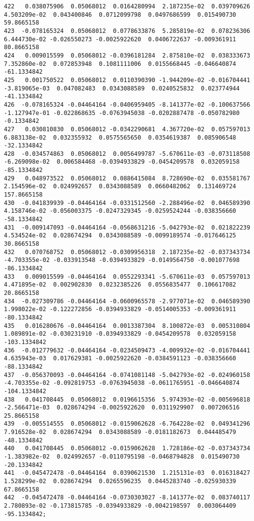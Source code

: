 \documentclass[15pt,a4paper,openright]{article}
\begin{document}
\begin{lstlisting}[language=AMPL, caption = data file]
422   0.038075906  0.05068012  0.0164280994  2.187235e-02  0.039709626  4.503209e-02  0.043400846  0.0712099798  0.0497686599  0.015490730   59.8665158
423  -0.078165324  0.05068012  0.0778633876  5.285819e-02  0.078236306  6.444730e-02 -0.026550273 -0.0025922620  0.0406722637 -0.009361911   80.8665158
424   0.009015599  0.05068012 -0.0396181284  2.875810e-02  0.038333673  7.352860e-02  0.072853948  0.1081111006  0.0155668445 -0.046640874  -61.1334842
425   0.001750522  0.05068012  0.0110390390 -1.944209e-02 -0.016704441 -3.819065e-03  0.047082483  0.0343088589  0.0240525832  0.023774944  -41.1334842
426  -0.078165324 -0.04464164 -0.0406959405 -8.141377e-02 -0.100637566 -1.127947e-01 -0.022868635 -0.0763945038 -0.0202887478 -0.050782980   -0.1334842
427   0.030810830  0.05068012 -0.0342290681  4.367720e-02  0.057597013  6.883138e-02  0.032355932  0.0575565650  0.0354619387  0.085906548  -32.1334842
428  -0.034574863  0.05068012  0.0056499787 -5.670611e-03 -0.073118508 -6.269098e-02  0.006584468 -0.0394933829 -0.0454209578  0.032059158  -85.1334842
429   0.048973522  0.05068012  0.0886415084  8.728690e-02  0.035581767  2.154596e-02  0.024992657  0.0343088589  0.0660482062  0.131469724  157.8665158
430  -0.041839939 -0.04464164 -0.0331512560 -2.288496e-02  0.046589390  4.158746e-02 -0.056003375 -0.0247329345 -0.0259524244 -0.038356660  -58.1334842
431  -0.009147093 -0.04464164 -0.0568631216 -5.042793e-02  0.021822239  4.534524e-02  0.028674294  0.0343088589 -0.0099189574 -0.017646125   30.8665158
432   0.070768752  0.05068012 -0.0309956318  2.187235e-02 -0.037343734 -4.703355e-02 -0.033913548 -0.0394933829 -0.0149564750 -0.001077698  -86.1334842
433   0.009015599 -0.04464164  0.0552293341 -5.670611e-03  0.057597013  4.471895e-02  0.002902830  0.0232385226  0.0556835477  0.106617082   20.8665158
434  -0.027309786 -0.04464164 -0.0600965578 -2.977071e-02  0.046589390  1.998022e-02 -0.122272856 -0.0394933829 -0.0514005353 -0.009361911  -80.1334842
435   0.016280676 -0.04464164  0.0013387304  8.100872e-03  0.005310804  1.089891e-02 -0.030231910 -0.0394933829 -0.0454209578  0.032059158 -103.1334842
436  -0.012779632 -0.04464164 -0.0234509473 -4.009932e-02 -0.016704441  4.635943e-03  0.017629381 -0.0025922620 -0.0384591123 -0.038356660  -88.1334842
437  -0.056370093 -0.04464164 -0.0741081148 -5.042793e-02 -0.024960158 -4.703355e-02 -0.092819753 -0.0763945038 -0.0611765951 -0.046640874 -104.1334842
438   0.041708445  0.05068012  0.0196615356  5.974393e-02 -0.005696818 -2.566471e-03  0.028674294 -0.0025922620  0.0311929907  0.007206516   25.8665158
439  -0.005514555  0.05068012 -0.0159062628 -6.764228e-02  0.049341296  7.916528e-02  0.028674294  0.0343088589 -0.0181182673  0.044485479  -48.1334842
440   0.041708445  0.05068012 -0.0159062628  1.728186e-02 -0.037343734 -1.383982e-02  0.024992657 -0.0110795198 -0.0468794828  0.015490730  -20.1334842
441  -0.045472478 -0.04464164  0.0390621530  1.215131e-03  0.016318427  1.528299e-02  0.028674294  0.0265596235  0.0445283740 -0.025930339   67.8665158
442  -0.045472478 -0.04464164 -0.0730303027 -8.141377e-02  0.083740117  2.780893e-02 -0.173815785 -0.0394933829 -0.0042198597  0.003064409  -95.1334842;
\end{lstlisting}
\end{document}
